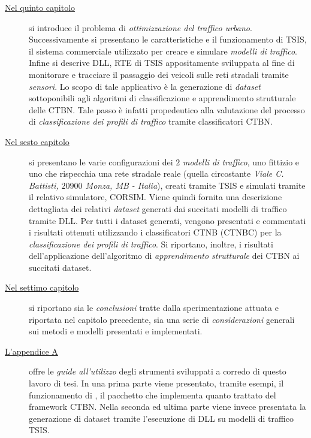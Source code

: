 \begin{description}
	\item[{\hyperref[cap:tsis-sensors]{Nel quinto capitolo}}]
	si introduce il problema di \emph{ottimizzazione del traffico urbano}. Successivamente si presentano le caratteristiche e il funzionamento di \acf{TSIS}, il sistema commerciale utilizzato per creare e simulare \emph{modelli di traffico}. Infine si descrive  \acs{DLL}, \acl{RTE} di \acs{TSIS} appositamente sviluppata al fine di monitorare e tracciare il passaggio dei veicoli sulle reti stradali tramite \emph{sensori}. Lo scopo di tale applicativo è la generazione di \emph{dataset} sottoponibili agli algoritmi di classificazione e apprendimento strutturale delle \acs{CTBN}. Tale passo è infatti propedeutico alla valutazione del processo di \emph{classificazione dei profili di traffico} tramite classificatori \acs{CTBN}.
	\item[{\hyperref[cap:esperimenti]{Nel sesto capitolo}}]
	si presentano le varie configurazioni dei $2$ \emph{modelli di traffico}, uno fittizio e uno che rispecchia una rete stradale reale (quella circostante \emph{Viale C. Battisti, $20900$ Monza, MB - Italia}), creati tramite \acs{TSIS} e simulati tramite il relativo simulatore, \acs{CORSIM}. Viene quindi fornita una descrizione dettagliata dei relativi \emph{dataset} generati dai succitati modelli di traffico tramite  \acs{DLL}. Per tutti i dataset generati, vengono presentati e commentati i risultati ottenuti utilizzando i classificatori \acs{CTNB} (\acs{CTNBC}) per la \emph{classificazione dei profili di traffico}. Si riportano, inoltre, i risultati dell'applicazione dell'algoritmo di \emph{apprendimento strutturale} dei \acs{CTBN} ai succitati dataset.
	\item[{\hyperref[cap:concl]{Nel settimo capitolo}}]
	si riportano sia le \emph{conclusioni} tratte dalla sperimentazione attuata e riportata nel capitolo precedente, sia una serie di \emph{considerazioni} generali sui metodi e modelli presentati e implementati.
	\item[{\hyperref[cap:guide]{L'appendice A}}]
	offre le \emph{guide all'utilizzo} degli strumenti sviluppati a corredo di questo lavoro di tesi. In una prima parte viene presentato, tramite esempi, il funzionamento di \rctbn{}, il pacchetto  che implementa quanto trattato del framework \acs{CTBN}. Nella seconda ed ultima parte viene invece presentata la generazione di dataset tramite l'esecuzione di  \acs{DLL} su modelli di traffico \acs{TSIS}.
\end{description}

